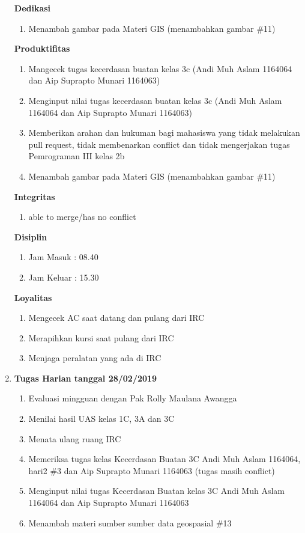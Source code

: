 \begin{enumerate}
\textbf{Dedikasi}
\begin{enumerate}
\item Menambah gambar pada Materi GIS (menambahkan gambar \#11) 
\end{enumerate}

\textbf{Produktifitas}
\begin{enumerate}
\item Mangecek tugas kecerdasan buatan kelas 3c (Andi Muh Aslam 1164064 dan Aip Suprapto Munari 1164063)
\item Menginput nilai tugas kecerdasan buatan kelas 3c (Andi Muh Aslam 1164064 dan Aip Suprapto Munari 1164063)
\item Memberikan arahan dan hukuman bagi mahasiswa yang tidak melakukan pull request, tidak membenarkan conflict dan tidak mengerjakan tugas Pemrograman III kelas 2b
\item Menambah gambar pada Materi GIS (menambahkan gambar \#11) 
\end{enumerate}

\textbf{Integritas}
\begin{enumerate}
\item able to merge/has no conflict
\end{enumerate}

\textbf{Disiplin}
\begin{enumerate}
\item Jam Masuk : 08.40
\item Jam Keluar : 15.30
\end{enumerate}

\textbf{Loyalitas}
\begin{enumerate}
\item Mengecek AC saat datang dan pulang dari IRC
\item Merapihkan kursi saat pulang dari IRC
\item Menjaga peralatan yang ada di IRC
\end{enumerate}


\item \textbf{Tugas Harian tanggal 28/02/2019}
\begin{enumerate}
\item Evaluasi mingguan dengan Pak Rolly Maulana Awangga
\item Menilai hasil UAS kelas 1C, 3A dan 3C
\item Menata ulang ruang IRC
\item Memeriksa tugas kelas Kecerdasan Buatan 3C Andi Muh Aslam 1164064, hari2 \#3 dan  Aip Suprapto Munari 1164063  (tugas masih conflict)
\item Menginput nilai tugas Kecerdasan Buatan kelas 3C Andi Muh Aslam 1164064 dan Aip Suprapto Munari 1164063 
\item Menambah materi sumber sumber data geospasial \#13
\end{enumerate}


\end{enumerate}
